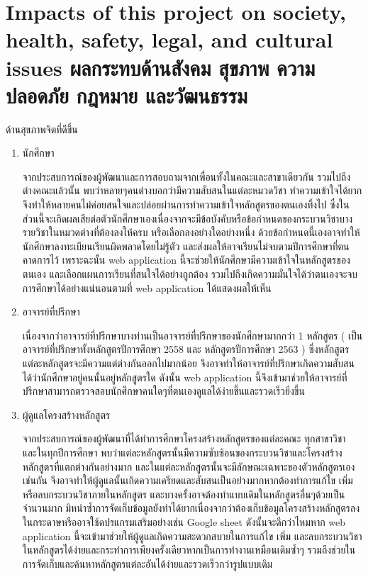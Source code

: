 \section{\ifenglish%
Impacts of this project on society, health, safety, legal, and cultural issues
\else%
ผลกระทบด้านสังคม สุขภาพ ความปลอดภัย กฎหมาย และวัฒนธรรม\fi}


ด้านสุขภาพจิตที่ดีขึ้น 

\begin{enumerate}
    \item นักศึกษา 
	
    จากประสบการณ์ของผู้พัฒนาและการสอบถามจากเพื่อนทั้งในคณะและสาขาเดียวกัน รวมไปถึงต่างคณะแล้วนั้น พบว่าหลายๆคนต่างบอกว่ามีความสับสนในแต่ละหมวดวิชา ทำความเข้าใจได้ยาก จึงทำให้หลายคนไม่ค่อยสนใจและปล่อยผ่านการทำความเข้าใจหลักสูตรของตนเองทิ้งไป  ซึ่งในส่วนนี้จะเกิดผลเสียต่อตัวนักศึกษาเองเนื่องจากจะมีข้อบังคับหรือข้อกำหนดของกระบวนวิชาบางรายวิชาในหมวดต่างที่ต้องลงให้ครบ หรือเลือกลงอย่างใดอย่างหนึ่ง ด้วยข้อกำหนดนี้เองอาจทำให้นักศึกษาลงทะเบียนเรียนผิดพลาดโดยไม่รู้ตัว และส่งผลให้อาจเรียนไม่จบตามปีการศึกษาที่ตนคาดการไว้ เพราะฉะนั้น web application นี้จะช่วยให้นักศึกษามีความเข้าใจในหลักสูตรของตนเอง และเลือกแผนการเรียนที่สนใจได้อย่างถูกต้อง รวมไปถึงเกิดความมั่นใจได้ว่าตนเองจะจบการศึกษาได้อย่างแน่นอนตามที่ web application ได้แสดงผลให้เห็น  

    
    \item อาจารย์ที่ปรึกษา 
	
    เนื่องจากว่าอาจารย์ที่ปรึกษาบางท่านเป็นอาจารย์ที่ปรึกษาของนักศึกษามากกว่า 1 หลักสูตร ( เป็นอาจารย์ที่ปรึกษาทั้งหลักสูตรปีการศึกษา 2558 และ หลักสูตรปีการศึกษา 2563 ) ซึ่งหลักสูตรแต่ละหลักสูตรจะมีความแต่ต่างกันออกไปมากน้อย จึงอาจทำให้อาจารย์ที่ปรึกษาเกิดความสับสนได้ว่านักศึกษาอยู่คนนั้นอยู่หลักสูตรใด ดังนั้น web application นี้จึงเข้ามาช่วยให้อาจารย์ที่ปรึกษาสามารถตรวจสอบนักศึกษาคนใดๆที่ตนเองดูแลได้ง่ายขึ้นและรวดเร็วยิ่งขึ้น

   
    \item ผู้ดูแลโครงสร้างหลักสูตร 
	
    จากประสบการณ์ของผู้พัฒนาที่ได้ทำการศึกษาโครงสร้างหลักสูตรของแต่ละคณะ ทุกสาขาวิชา และในทุกปีการศึกษา พบว่าแต่ละหลักสูตรนั้นมีความซับซ้อนของกระบวนวิชาและโครงสร้างหลักสูตรที่แตกต่างกันอย่างมาก และในแต่ละหลักสูตรนั้นจะมีลักษณะเฉพาะของตัวหลักสูตรเองเช่นกัน จึงอาจทำให้ผู้ดูแลนั้นเกิดความเครียดและสับสนเป็นอย่างมากหากต้องทำการแก้ไข เพิ่ม หรือลบกระบวนวิชาภายในหลักสูตร และบางครั้งอาจต้องทำแบบเดิมในหลักสูตรอื่นๆด้วยเป็นจำนวนมาก มิหนำซ้ำการจัดเก็บข้อมูลยังทำได้ยากเนื่องจากว่าต้องเก็บข้อมูลโครงสร้างหลักสูตรลงในกระดาษหรืออาจใช้ดปรแกรมเสริมอย่างเช่น Google sheet ดังนั้นจะดีกว่าไหมหาก web application นี้จะเข้ามาช่วยให้ผู้ดูแลเกิดความสะดวกสบายในการแก้ไข เพิ่ม และลบกระบวนวิชาในหลักสูตรได้ง่ายและกระทำการเพียงครั้งเดียวหากเป็นการทำงานเหมือนเดิมซ้ำๆ รวมถึงช่วยในการจัดเก็บและค้นหาหลักสูตรแต่ละอันได้ง่ายและรวดเร็วกว่ารูปแบบเดิม   
\end{enumerate}
